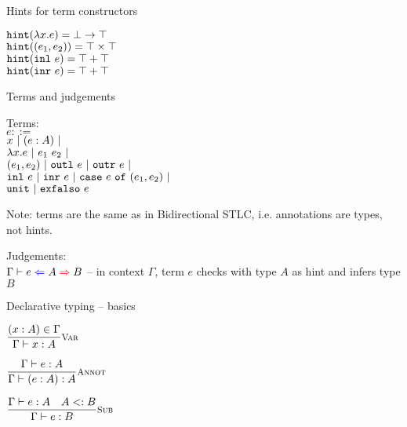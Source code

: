 \documentclass{beamer}
\begin{document}
\begin{frame}{Hints for term constructors}

\begin{center}
  $\hintfor{\fun{x}{e}} = \Fun{\Bot}{\Top}$ \\
  $\hintfor{\pair{e_1}{e_2}} = \Prod{\Top}{\Top}$ \\
  $\hintfor{\inl{e}} = \Sum{\Top}{\Top}$ \\
  $\hintfor{\inr{e}} = \Sum{\Top}{\Top}$
\end{center}

\end{frame}

\begin{frame}{Terms and judgements}

Terms: \\
$e ::=$ \\
\qquad $x \pipe \annot{e}{A} \pipe$ \\
\qquad $\fun{x}{e} \pipe \app{e_1}{e_2} \pipe$ \\
\qquad $\pair{e_1}{e_2} \pipe \outl{e} \pipe \outr{e} \pipe$ \\
\qquad $\inl{e} \pipe \inr{e} \pipe \case{e}{e_1}{e_2} \pipe$ \\
\qquad $\unit \pipe \exfalso{e}$

\vspace{2em}

Note: terms are the same as in Bidirectional STLC, i.e. annotations are types, not hints.

\vspace{2em}

Judgements: \\
$\fullhinting{\Gamma}{e}{A}{B}$ -- in context $\Gamma$, term $e$ checks with type $A$ as hint and infers type $B$

\end{frame}

\begin{frame}{Declarative typing -- basics}

\begin{center}
  $\infrule[Var]{\sidecond{(x : A) \in \Gamma}}{\typing{x}{A}}$

  \vspace{2em}

  $\infrule[Annot]{\typing{e}{A}}{\typing{\annot{e}{A}}{A}}$

  \vspace{2em}

  $\infrule[Sub]{\typing{e}{A} \quad \sidecond{\subtyping{A}{B}}}{\typing{e}{B}}$
\end{center}

\end{frame}
\end{document}
